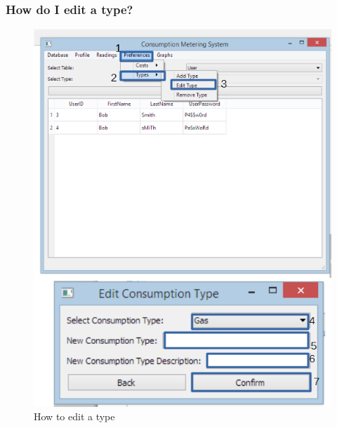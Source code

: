 \subsubsection{How do I edit a type?}\label{question:edit_type}
\begin{figure}[H]
	\includegraphics{./manual/images/edit_type.png}
	\caption{How to edit a type}
\end{figure}


